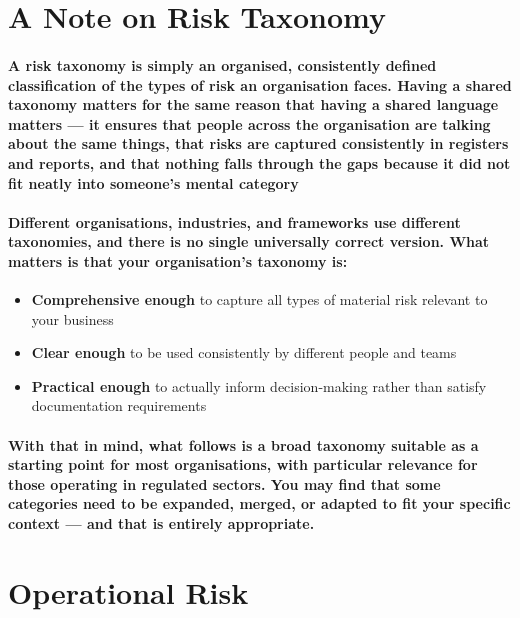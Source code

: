 \section{A Note on Risk Taxonomy}
\paragraph{A \textbf{risk taxonomy} is simply an organised, consistently defined classification of the types of risk an organisation faces. Having a shared taxonomy matters for the same reason that having a shared language matters — it ensures that people across the organisation are talking about the same things, that risks are captured consistently in registers and reports, and that nothing falls through the gaps because it did not fit neatly into someone's mental category}

\paragraph{Different organisations, industries, and frameworks use different taxonomies, and there is no single universally correct version. What matters is that your organisation's taxonomy is:}
\begin{itemize}
  \item{\textbf{Comprehensive enough} to capture all types of material risk relevant to your business}
  \item{\textbf{Clear enough} to be used consistently by different people and teams}
  \item{\textbf{Practical enough} to actually inform decision-making rather than satisfy documentation requirements}
\end{itemize}

\paragraph{With that in mind, what follows is a broad taxonomy suitable as a starting point for most organisations, with particular relevance for those operating in regulated sectors. You may find that some categories need to be expanded, merged, or adapted to fit your specific context — and that is entirely appropriate.}

\section{Operational Risk}
